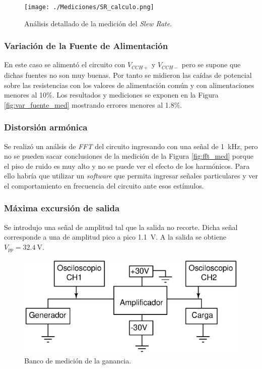		\begin{figure}[h!]
			\centering
			\texttt{[image: ./Mediciones/SR\_calculo.png]}
			\caption{Análisis detallado de la medición del \emph{Slew Rate}.}
			\label{fig:analisis_sr_med}
		\end{figure}

		\subsubsection{Variación de la Fuente de Alimentación}
		
		En este caso se alimentó el circuito con $V_{CCH+}$ y $V_{CCH-}$ pero se supone que dichas fuentes no son muy buenas. Por tanto se midieron las caídas de potencial sobre las resistencias con los valores de alimentación común y con alimentaciones menores al 10\%. Los resultados y mediciones se exponen en la Figura \ref{fig:var_fuente_med} mostrando errores menores al \num{1.8}\%.


		\subsubsection{Distorsión armónica}
		
			Se realizó un análsis de \emph{FFT} del circuito ingresando con una señal de \SI{1}{\kHz}, pero no se pueden sacar conclusiones de la medición de la Figura \ref{fig:fft_med} porque el piso de ruido es muy alto y no se puede ver el efecto de los harmónicos. Para ello habría que utilizar un \emph{software} que permita ingresar señales particulares y ver el comportamiento en frecuencia del circuito ante esos estímulos.


		\subsubsection{Máxima excursión de salida}
			
		Se introdujo una señal de amplitud tal que la salida no recorte. Dicha señal corresponde a una de amplitud pico a pico \SI{1.1}{\V}. A la salida se obtiene $V_{pp} = \SI{32.4}{\V}$.

		\begin{figure}[h!]
			\centering
			\includegraphics[scale=0.6]{./Figuras/bco_ganancia.eps}
			\caption{Banco de medición de la ganancia.}
			\label{fig:bco_ganancia}
		\end{figure}

